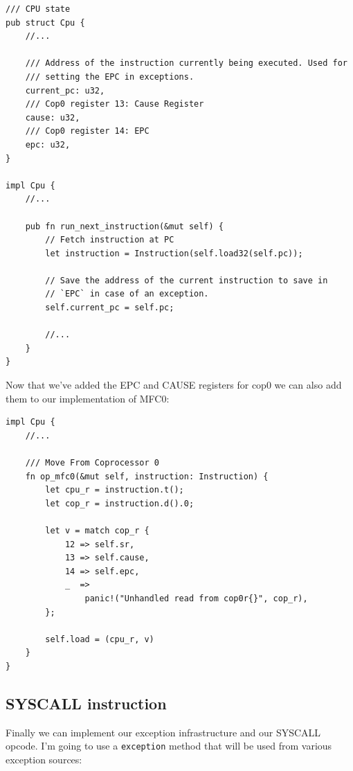 \documentclass[a4paper]{article}
\newcommand{\code}[1] {\texttt{#1}}
\begin{document}
\begin{lstlisting}
/// CPU state
pub struct Cpu {
    //...

    /// Address of the instruction currently being executed. Used for
    /// setting the EPC in exceptions.
    current_pc: u32,
    /// Cop0 register 13: Cause Register
    cause: u32,
    /// Cop0 register 14: EPC
    epc: u32,
}

impl Cpu {
    //...

    pub fn run_next_instruction(&mut self) {
        // Fetch instruction at PC
        let instruction = Instruction(self.load32(self.pc));

        // Save the address of the current instruction to save in
        // `EPC` in case of an exception.
        self.current_pc = self.pc;

        //...
    }
}
\end{lstlisting}


Now that we've added the EPC and CAUSE registers for cop0 we can also
add them to our implementation of MFC0:

\begin{lstlisting}
impl Cpu {
    //...

    /// Move From Coprocessor 0
    fn op_mfc0(&mut self, instruction: Instruction) {
        let cpu_r = instruction.t();
        let cop_r = instruction.d().0;

        let v = match cop_r {
            12 => self.sr,
            13 => self.cause,
            14 => self.epc,
            _  =>
                panic!("Unhandled read from cop0r{}", cop_r),
        };

        self.load = (cpu_r, v)
    }
}
\end{lstlisting}

\subsection{SYSCALL instruction}

Finally we can implement our exception infrastructure and our SYSCALL
opcode. I'm going to use a \code{exception} method that will be used
from various exception sources:
\end{document}
